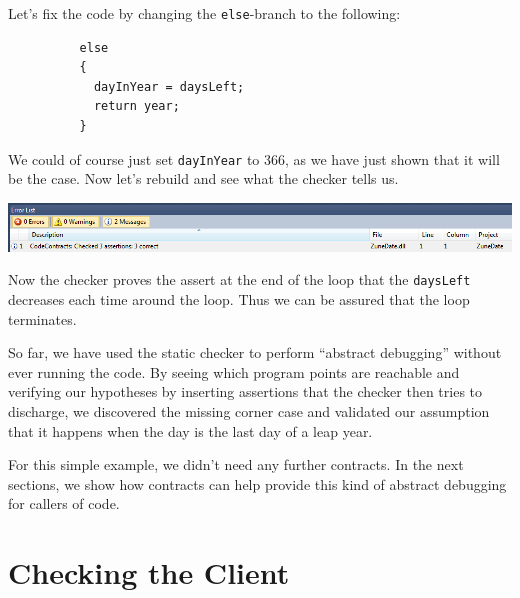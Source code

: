 \documentclass{article}
\newcommand{\code}[1]{\lstinline{#1}}
\begin{document}
Let's fix the code by changing the \code{else}-branch to the
following:
\begin{lstlisting}
          else
          {
            dayInYear = daysLeft;
            return year;
          }
\end{lstlisting}
We could of course just set \code{dayInYear} to 366, as we have just
shown that it will be the case.
Now let's rebuild and see what the checker tells us.
\begin{center}
  \includegraphics[width=1\columnwidth]{errors3.png}
\end{center}
Now the checker proves the assert at the end of the loop that the
\code{daysLeft} decreases each time around the loop. Thus we can be
assured that the loop
terminates. 

So far, we have used the static checker to perform ``abstract
debugging'' without ever running the code. By seeing which program
points are reachable and verifying our hypotheses by inserting
assertions that the checker then tries to discharge, we discovered the
missing corner case and validated our assumption that it happens when
the day is the last day of a leap year.

For this simple example, we didn't need any further contracts. In the
next sections, we show how contracts can help provide this kind of
abstract debugging for callers of code.

\section{Checking the Client}
\end{document}
